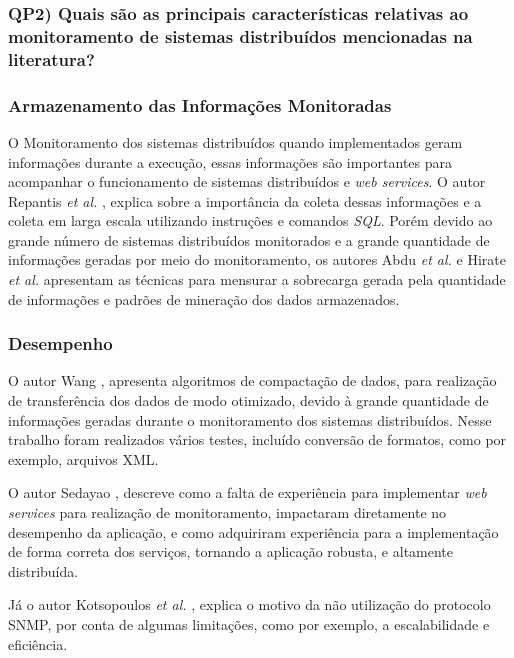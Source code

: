 \subsubsection{QP2) Quais são as principais características relativas ao monitoramento de sistemas distribuídos mencionadas na literatura?}

\subsubsection{Armazenamento das Informações Monitoradas}

O Monitoramento dos sistemas distribuídos quando implementados geram informações durante a execução, essas informações são importantes para acompanhar o funcionamento de sistemas distribuídos e \textit{web services}. O autor Repantis \textit{et al.} \cite{repantis2010scaling}, explica sobre a importância da coleta dessas informações e a coleta em larga escala utilizando instruções e comandos \textit{SQL}. Porém devido ao grande número de sistemas distribuídos monitorados e a grande quantidade de informações geradas por meio do monitoramento, os autores Abdu \textit{et al.} e Hirate \textit{et al.} \cite{abdu1996monitoring,hirate2009profiling} apresentam as técnicas para mensurar a sobrecarga gerada pela quantidade de informações e padrões de mineração dos dados armazenados.  

\subsubsection{Desempenho}

O autor Wang \cite{wang2016improvements}, apresenta algoritmos de compactação de dados, para realização de transferência dos dados de modo otimizado, devido à grande quantidade de informações geradas durante o monitoramento dos sistemas distribuídos. Nesse trabalho foram realizados vários testes, incluído conversão de formatos, como por exemplo, arquivos XML. 

O autor Sedayao \cite{sedayao2008implementing}, descreve como a falta de experiência para implementar \textit{web services} para realização de monitoramento, impactaram diretamente no desempenho da aplicação, e como adquiriram experiência para a implementação de forma correta dos serviços, tornando a aplicação robusta, e altamente distribuída. 

Já o autor Kotsopoulos \textit{et al.} \cite{kotsopoulos2008soa}, explica o motivo da não utilização do protocolo \acrshort{SNMP}, por conta de algumas limitações, como por exemplo, a escalabilidade e eficiência. 


